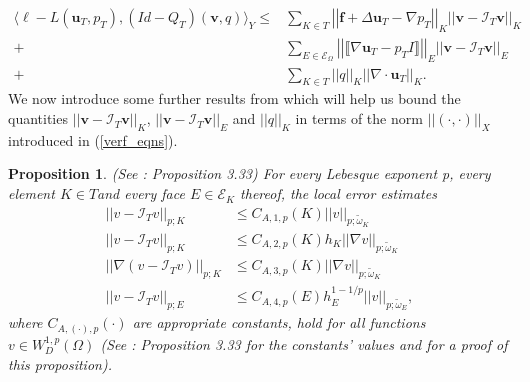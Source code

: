\documentclass[12pt,a4paper]{article}
\newtheorem{proposition}[theorem]{Proposition}
\theoremstyle{definition}
\begin{document}
\begin{equation}\label{verf-a-posteriori-bound-cs}
\begin{aligned}
\langle \ell -L\left(\textbf{u}_T,p_T\right),\left(Id-Q_T\right)\left(\textbf{v},q\right) \rangle_Y\leq
&\sum_{K\in T}\left|\left|\textbf{f}+\Delta \textbf{u}_T-\nabla p_T \right|\right|_K \left|\left|\textbf{v}-\mathcal{I}_T\textbf{v}\right|\right|_K\\
+&\sum_{E\in \mathcal{E}_{\Omega}}\left|\left|\llbracket\nabla \textbf{u}_T-p_TI\rrbracket \right|\right|_E \left|\left|\textbf{v}-\mathcal{I}_T\textbf{v}\right|\right|_E\\
+&\sum_{K\in T}\left|\left|q\right|\right|_K\left|\left|\nabla \cdot \textbf{u}_T\right|\right|_K.
\end{aligned}
\end{equation}
We now introduce some further results from \cite{verfurth2013posteriori} which will help us bound the quantities $\left|\left|\textbf{v}-\mathcal{I}_T\textbf{v}\right|\right|_K$, $\left|\left|\textbf{v}-\mathcal{I}_T\textbf{v}\right|\right|_E$ and $\left|\left|q\right|\right|_K$ in terms of the norm $\left|\left|\left(\cdot,\cdot\right)\right|\right|_X$ introduced in (\ref{verf_eqns}).
\begin{proposition}{(See \cite[ \S3.5]{verfurth2013posteriori}: Proposition 3.33)} \label{verf_prop_bounds} For every Lebesque exponent p, every element $K\in T$and every face $E\in\mathcal{E}_K$ thereof, the local error estimates
\begin{equation}\label{proposition_bounds_verf}
\begin{aligned}
\left|\left|v-\mathcal{I}_Tv\right|\right|_{p;K}&\leq C_{A,1,p}\left(K\right)\left|\left|v\right|\right|_{p;\widetilde{\omega}_K}\\
\left|\left|v-\mathcal{I}_Tv\right|\right|_{p;K}&\leq C_{A,2,p}\left(K\right)h_K\left|\left|\nabla v\right|\right|_{p;\widetilde{\omega}_K}\\
\left|\left|\nabla\left(v-\mathcal{I}_Tv\right)\right|\right|_{p;K}&\leq C_{A,3,p}\left(K\right)\left|\left|\nabla v\right|\right|_{p;\widetilde{\omega}_K}\\
\left|\left|v-\mathcal{I}_Tv\right|\right|_{p;E}&\leq C_{A,4,p}\left(E\right)h_E^{1-1/p}\left|\left|v\right|\right|_{p;\widetilde{\omega}_E},
\end{aligned}\nonumber
\end{equation}
where $C_{A,\left(\cdot\right),p}\left(\cdot\right)$ are appropriate constants, hold for all functions $v\in W^{1,p}_D\left(\Omega\right)$ (See \cite{verfurth2013posteriori}: Proposition 3.33 for the constants' values and for a proof of this proposition).
\end{proposition}
\end{document}
